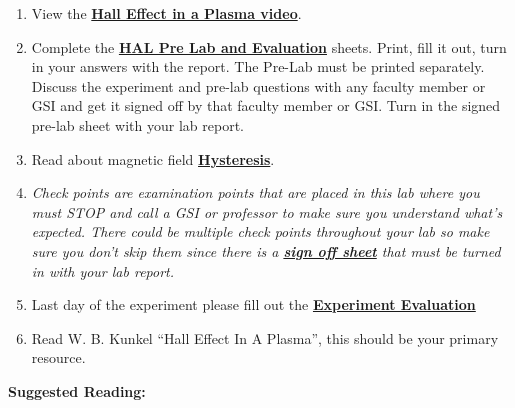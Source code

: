 \documentclass{../lab}
\begin{document}
\begin{enumerate}
    \item View the \href{http://youtu.be/iZkOlZDyb2U}{\textbf{Hall Effect in a Plasma video}}.

    \item Complete the \href{http://experimentationlab.berkeley.edu/HALPreLab}{\textbf{HAL Pre Lab and Evaluation}} sheets. Print, fill it out, turn in your answers with the report. The Pre-Lab must be printed separately. Discuss the experiment and pre-lab questions with any faculty member or GSI and get it signed off by that faculty member or GSI. Turn in the signed pre-lab sheet with your lab report.

    \item Read about magnetic field \href{http://experimentationlab.berkeley.edu/hysteresis}{\textbf{Hysteresis}}.

    \item \emph{Check points are examination points that are placed in this lab where you must STOP and call a GSI or professor to make sure you understand what's expected. There could  be multiple check points throughout your lab so make sure you don't skip them since there is a \href{http://experimentationlab.berkeley.edu/halcheckpoints}{\textbf{sign off sheet}} that must be turned in with your lab report.}

    \item Last day of the experiment please fill out the \href{\ExperimentEvaluation}{\textbf{Experiment Evaluation}}

    \item Read W. B. Kunkel ``Hall Effect In A Plasma'', this should be your primary resource.

\end{enumerate}

\noindent\textbf{Suggested Reading:}
\end{document}
